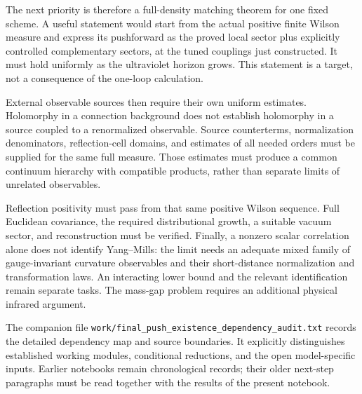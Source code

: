\documentclass[11pt]{article}
\theoremstyle{remark}
\begin{document}
The next priority is therefore a full-density matching theorem for
one fixed scheme. A useful statement would start from the actual
positive finite Wilson measure and express its pushforward as the
proved local sector plus explicitly controlled complementary sectors,
at the tuned couplings just constructed. It must hold uniformly as
the ultraviolet horizon grows. This statement is a target, not a
consequence of the one-loop calculation.

External observable sources then require their own uniform estimates.
Holomorphy in a connection background does not establish holomorphy
in a source coupled to a renormalized observable. Source counterterms,
normalization denominators, reflection-cell domains, and estimates
of all needed orders must be supplied for the same full measure.
Those estimates must produce a common continuum hierarchy with
compatible products, rather than separate limits of unrelated
observables.

Reflection positivity must pass from that same positive Wilson
sequence. Full Euclidean covariance, the required distributional
growth, a suitable vacuum sector, and reconstruction must be verified.
Finally, a nonzero scalar correlation alone does not identify
Yang--Mills: the limit needs an adequate mixed family of gauge-invariant
curvature observables and their short-distance normalization and
transformation laws. An interacting lower bound and the relevant
identification remain separate tasks. The mass-gap problem requires
an additional physical infrared argument.

The companion file
\texttt{work/final\_push\_existence\_dependency\_audit.txt}
records the detailed dependency map and source boundaries.
It explicitly distinguishes established working modules, conditional
reductions, and the open model-specific inputs. Earlier notebooks
remain chronological records; their older next-step paragraphs
must be read together with the results of the present notebook.
\end{document}

